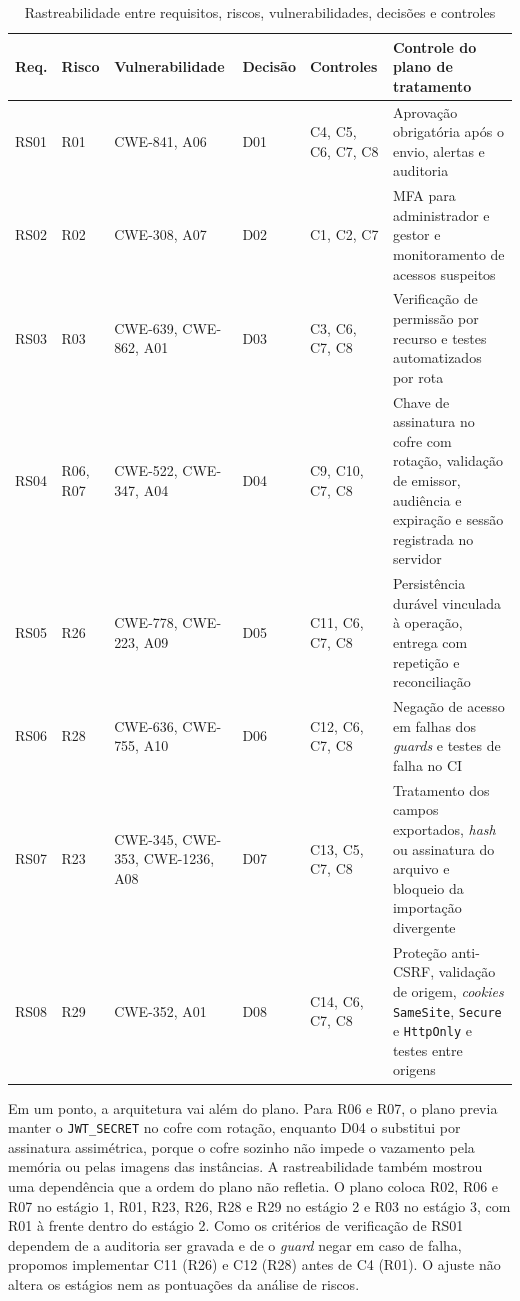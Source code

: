\documentclass[conference]{IEEEtran}
\begin{document}
\begin{table}[!t]
\centering
\caption{Rastreabilidade entre requisitos, riscos, vulnerabilidades, decisões e controles}
\label{tab:rastreabilidade}
\footnotesize
\renewcommand{\arraystretch}{1.15}
\begin{tabularx}{\textwidth}{@{}l l >{\raggedright\arraybackslash}p{2.9cm} l >{\raggedright\arraybackslash}p{1.6cm} Y@{}}
\hline
\textbf{Req.} & \textbf{Risco} & \textbf{Vulnerabilidade} & \textbf{Decisão} & \textbf{Controles} & \textbf{Controle do plano de tratamento} \\
\hline
RS01 & R01 & CWE-841, A06 & D01 & C4, C5, C6, C7, C8 & Aprovação obrigatória após o envio, alertas e auditoria \\
RS02 & R02 & CWE-308, A07 & D02 & C1, C2, C7 & MFA para administrador e gestor e monitoramento de acessos suspeitos \\
RS03 & R03 & CWE-639, CWE-862, A01 & D03 & C3, C6, C7, C8 & Verificação de permissão por recurso e testes automatizados por rota \\
RS04 & R06, R07 & CWE-522, CWE-347, A04 & D04 & C9, C10, C7, C8 & Chave de assinatura no cofre com rotação, validação de emissor, audiência e expiração e sessão registrada no servidor \\
RS05 & R26 & CWE-778, CWE-223, A09 & D05 & C11, C6, C7, C8 & Persistência durável vinculada à operação, entrega com repetição e reconciliação \\
RS06 & R28 & CWE-636, CWE-755, A10 & D06 & C12, C6, C7, C8 & Negação de acesso em falhas dos \textit{guards} e testes de falha no CI \\
RS07 & R23 & CWE-345, CWE-353, CWE-1236, A08 & D07 & C13, C5, C7, C8 & Tratamento dos campos exportados, \textit{hash} ou assinatura do arquivo e bloqueio da importação divergente \\
RS08 & R29 & CWE-352, A01 & D08 & C14, C6, C7, C8 & Proteção anti-CSRF, validação de origem, \textit{cookies} \texttt{SameSite}, \texttt{Secure} e \texttt{HttpOnly} e testes entre origens \\
\hline
\end{tabularx}
\end{table}

Em um ponto, a arquitetura vai além do plano. Para R06 e R07, o plano previa manter o \texttt{JWT\_SECRET} no cofre com rotação, enquanto D04 o substitui por assinatura assimétrica, porque o cofre sozinho não impede o vazamento pela memória ou pelas imagens das instâncias. A rastreabilidade também mostrou uma dependência que a ordem do plano não refletia. O plano coloca R02, R06 e R07 no estágio 1, R01, R23, R26, R28 e R29 no estágio 2 e R03 no estágio 3, com R01 à frente dentro do estágio 2. Como os critérios de verificação de RS01 dependem de a auditoria ser gravada e de o \textit{guard} negar em caso de falha, propomos implementar C11 (R26) e C12 (R28) antes de C4 (R01). O ajuste não altera os estágios nem as pontuações da análise de riscos.
\end{document}
